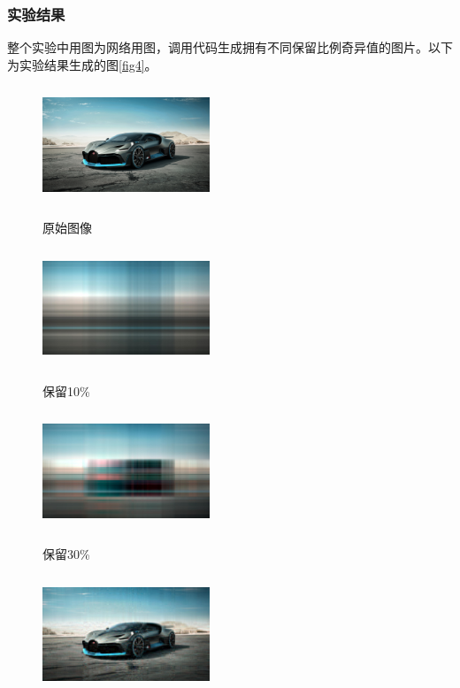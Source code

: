 \documentclass{hfutpaper}
\begin{document}
	\subsubsection{实验结果}
	整个实验中用图为网络用图，调用代码生成拥有不同保留比例奇异值的图片。以下为实验结果生成的图\ref{fig4}。
\begin{figure}[htbp]
	\centering
	\begin{minipage}{0.32\linewidth}	
		\centering
		\includegraphics[width=5cm,height=3.5cm]{supercar.jpeg}
		\centerline{原始图像}	
	\end{minipage}
	\begin{minipage}{0.32\linewidth}	
		\centering
		\includegraphics[width=5cm,height=3.5cm]{test1.jpeg}
		\centerline{保留10\%}	
	\end{minipage}
	\begin{minipage}{0.32\linewidth}	
		\vspace{3pt}	
		\centerline{\includegraphics[width=5cm,height=3.5cm]{test3.jpeg}}		
		\centerline{保留30\%}	
	\end{minipage}
	\begin{minipage}{0.32\linewidth}	
		\vspace{3pt}
		\centerline{\includegraphics[width=5cm,height=3.5cm]{test5.jpeg}}

\end{minipage}
\end{figure}
\end{document}
